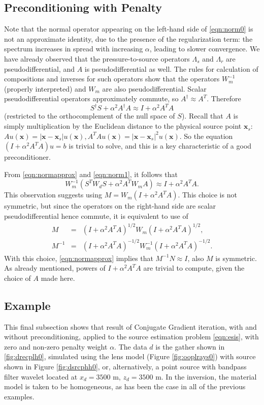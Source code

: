 \documentclass[12pt]{geophysics}
\newcommand{\bx}{\mathbf{x}}
\begin{document}
\subsection{Preconditioning with Penalty}

Note that the normal operator appearing on the left-hand side of
\ref{eqn:norm0} is not an approximate identity, due to the presence of
the regularization term: the spectrum increases in spread with
increasing $\alpha$, leading to slower convergence. We have already
observed that the pressure-to-source operators $\Lambda_s$ and
$\Lambda_r$ are pseudodifferential, and $A$ is pseudodifferential as
well. The rules for calculation of
compositions and inverses for such operators show that the operators
$W_m^{-1}$ (properly interpreted) and $W_m$ are also pseudodifferential.
Scalar pseudodifferential operators approximately
commute, so $A^{\dagger} \approx A^T$. Therefore
\begin{equation}
  \label{eqn:normapprox}
  S^{\dagger}S + \alpha^2 A^{\dagger}A \approx I + \alpha^2A^TA
\end{equation}
(restricted to the orthocomplement of the null space of $S$).
Recall that $A$ is simply multiplication by the Euclidean distance to
the physical source point $\bx_s$: $A u (\bx) = |\bx-\bx_s|u(\bx),
A^TAu(\bx) = |\bx-\bx_s|^2u(\bx)$. So the equation $(I+\alpha^2
A^TA)u=b$ is trivial to solve, and this is a key characteristic of a
good preconditioner. 


From \ref{eqn:normapprox} and \ref{eqn:norm1}, it follows that
\[
  W_m^{-1}(S^TW_dS + \alpha^2 A^TW_mA) \approx I + \alpha^2 A^TA.
\]
This observation suggests using $M=W_m(I+\alpha^2A^TA)$. This choice
is not symmetric, but since the operators on the right-hand side are
scalar pseudodifferential hence commute, it is equivalent to use of
\begin{eqnarray}
  M         &=&(I+\alpha^2A^TA)^{1/2}W_m(I+\alpha^2A^TA)^{1/2},\nonumber \\
  M^{-1}
            &=&(I+\alpha^2A^TA)^{-1/2}W_m^{-1}(I+\alpha^2A^TA)^{-1/2}.
                \label{eqn:defprecond}
\end{eqnarray}
With this choice, \ref{eqn:normapprox} implies that
$M^{-1}N \approx I$, also $M$ is symmetric. As already mentioned,
powers of $I + \alpha^2A^TA$ are trivial to compute, given the choice
of $A$ made here. 

\subsection{Example}
This final subsection shows that result of Conjugate Gradient
iteration, with and without preconditioning, applied to the source
estimation problem \ref{eqn:esis}, with zero and non-zero penalty
weight $\alpha$. The data $d$ is the gather shown in
\ref{fig:drecplh0}, simulated using the lens model (Figure \ref{fig:ooplrays0}) with source shown
in Figure \ref{fig:dsrcphh0}, or, alternatively, a point source with
bandpass filter wavelet located at $x_d=3500$ m, $z_d=3500$ m. In the inversion,
the material model is taken to be homogeneous, as has been the case in
all of the previous examples. 
\end{document}
